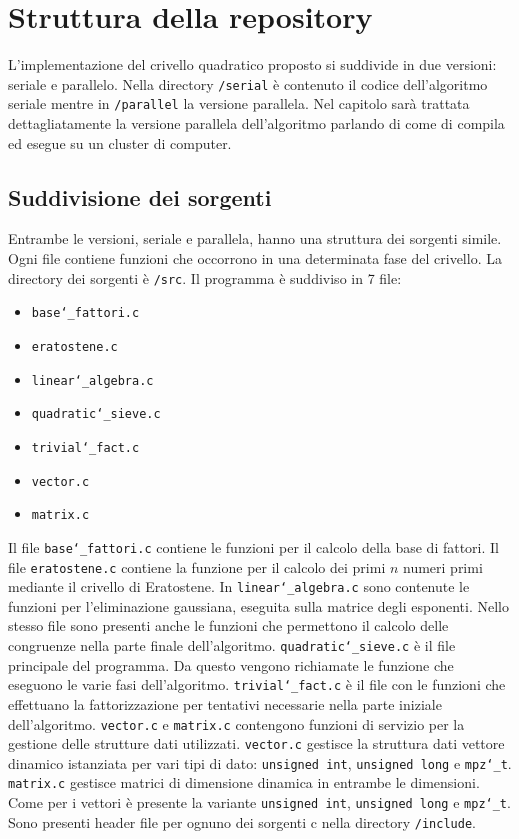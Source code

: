 \section{Struttura della repository}
\label{sec:struttura}
L'implementazione del crivello quadratico proposto si suddivide in due
versioni: seriale e parallelo. Nella directory \texttt{/serial} è contenuto
il codice dell'algoritmo seriale mentre in \texttt{/parallel} la versione
parallela. Nel capitolo sarà trattata dettagliatamente la versione
parallela dell'algoritmo parlando di come di compila ed esegue su un
cluster di computer.
\subsection{Suddivisione dei sorgenti}
Entrambe le versioni, seriale e parallela, hanno una struttura dei sorgenti simile.
Ogni file contiene funzioni che occorrono in una determinata fase del
crivello. La directory dei sorgenti è \texttt{/src}. Il programma è
suddiviso in 7 file:
\begin{itemize}
\item \texttt{base\char`_fattori.c}
\item \texttt{eratostene.c}
\item \texttt{linear\char`_algebra.c}
\item \texttt{quadratic\char`_sieve.c}
\item \texttt{trivial\char`_fact.c}
\item \texttt{vector.c}
\item \texttt{matrix.c}
\end{itemize}
Il file \texttt{base\char`_fattori.c} contiene le funzioni per il
calcolo della base di fattori. Il file \texttt{eratostene.c} contiene
la funzione per il calcolo dei primi $n$ numeri primi mediante il
crivello di Eratostene. In \texttt{linear\char`_algebra.c} sono
contenute  le funzioni per l'eliminazione gaussiana, eseguita sulla
matrice degli esponenti. Nello stesso file sono presenti anche le
funzioni che permettono il calcolo delle congruenze nella parte
finale dell'algoritmo. \texttt{quadratic\char`_sieve.c} è il file
principale del programma. Da questo vengono richiamate 
le funzione che eseguono le varie fasi
dell'algoritmo. \texttt{trivial\char`_fact.c} è il file con le
funzioni che effettuano la fattorizzazione per tentativi necessarie
nella parte iniziale dell'algoritmo. \texttt{vector.c} e
\texttt{matrix.c} contengono funzioni di servizio per la
gestione delle strutture dati utilizzati. \texttt{vector.c} gestisce
la struttura dati vettore dinamico istanziata per vari tipi di dato:
\texttt{unsigned int}, \texttt{unsigned long} e \texttt{mpz\char`_t}. 
\texttt{matrix.c} gestisce matrici di dimensione dinamica in entrambe le
dimensioni. Come per i vettori è presente la variante \texttt{unsigned
int}, \texttt{unsigned long} e \texttt{mpz\char`_t}.
Sono presenti header file per ognuno dei sorgenti c nella directory 
\texttt{/include}.
